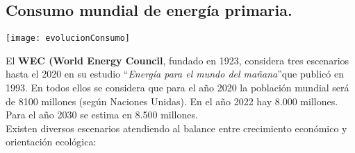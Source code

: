 		\subsection{Consumo mundial de energía primaria.}
			\texttt{[image: evolucionConsumo]}
			
			El \textbf{WEC (World Energy Council}, fundado en 1923, considera tres
			escenarios hasta el 2020 en su estudio \textquotedblleft \textit{Energía para el mundo del mañana}\textquotedblright que publicó en 1993.
			En todos ellos se considera que para el año 2020 la población mundial será de 8100 millones
			(según Naciones Unidas). En el año 2022 hay 8.000 millones. Para el año 2030 se estima en 8.500
			millones.\\
			\indent Existen diversos escenarios atendiendo al balance entre crecimiento económico y orientación ecológica:
